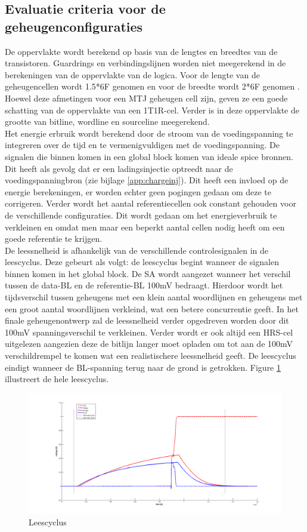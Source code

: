 \subsection{Evaluatie criteria voor de geheugenconfiguraties}
De oppervlakte wordt berekend op basis van de lengtes en breedtes van de transistoren. Guardrings en verbindingslijnen worden niet meegerekend in de berekeningen van de oppervlakte van de logica. Voor de lengte van de geheugencellen wordt 1.5*6F genomen en voor de breedte wordt 2*6F genomen \cite{ppt:cosemans}. Hoewel deze afmetingen voor een MTJ geheugen cell zijn, geven ze een goede schatting van de oppervlakte van een 1T1R-cel. Verder is in deze oppervlakte de grootte van bitline, wordline en sourceline meegerekend. \\
Het energie erbruik wordt berekend door de stroom van de voedingspanning te integreren over de tijd en te vermenigvuldigen met de voedingspanning. De signalen die binnen komen in een global block komen van ideale spice bronnen. Dit heeft als gevolg dat er een ladingsinjectie optreedt naar de voedingspanningbron (zie bijlage \ref{app:chargeinj}). Dit heeft een invloed op de energie berekeningen, er worden echter geen pogingen gedaan om deze te corrigeren. Verder wordt het aantal referentiecellen ook constant gehouden voor de verschillende configuraties. Dit wordt gedaan om het energieverbruik te verkleinen en omdat men maar een beperkt aantal cellen nodig heeft om een goede referentie te krijgen.\\
De leessnelheid is afhankelijk van de verschillende controlesignalen in de leescyclus. Deze gebeurt als volgt: de leescyclus begint wanneer de signalen binnen komen in het global block. De SA wordt aangezet wanneer het verschil tussen de data-BL en de referentie-BL 100mV bedraagt. Hierdoor wordt het tijdsverschil tussen geheugens met een klein aantal woordlijnen en geheugens met een groot aantal woordlijnen verkleind, wat een betere concurrentie geeft. In het finale geheugenontwerp zal de leessnelheid verder opgedreven worden door dit 100mV spanningsverschil te verkleinen. Verder wordt er ook altijd een HRS-cel uitgelezen aangezien deze de bitlijn langer moet opladen om tot aan de 100mV verschildrempel te komen wat een realistischere leessnelheid geeft. De leescyclus eindigt wanneer de BL-spanning terug naar de grond is getrokken. Figure \ref{fig:leescyclus} illustreert de hele leescyclus.

\begin{figure}[!ht]
  \centering
  \includegraphics[scale=0.6]{../fig/hfdstk-timing-leescyclus.png}
  \caption{Leescyclus}
  \label{fig:leescyclus}
\end{figure} 

